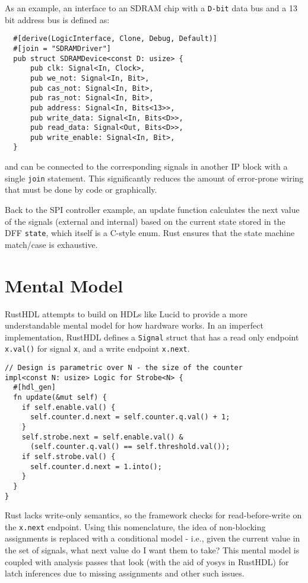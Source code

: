 \documentclass[sigplan,screen,sigconf]{acmart}
\begin{document}
As an example, an interface to an SDRAM chip with a \verb|D-bit| data bus and a 13 bit 
address bus is defined as:

\begin{verbatim}
  #[derive(LogicInterface, Clone, Debug, Default)]
  #[join = "SDRAMDriver"]
  pub struct SDRAMDevice<const D: usize> {
      pub clk: Signal<In, Clock>,
      pub we_not: Signal<In, Bit>,
      pub cas_not: Signal<In, Bit>,
      pub ras_not: Signal<In, Bit>,
      pub address: Signal<In, Bits<13>>,
      pub write_data: Signal<In, Bits<D>>,
      pub read_data: Signal<Out, Bits<D>>,
      pub write_enable: Signal<In, Bit>,
  }
\end{verbatim}

and can be connected to the corresponding signals in another IP block with a single \verb|join|
statement.  This significantly reduces the amount of error-prone wiring that must be done
by code or graphically.

Back to the SPI controller example, an update function calculates the next value of the 
signals (external and internal) based on the current state stored in the DFF \verb|state|,
which itself is a C-style enum.  Rust ensures that the state machine match/case is exhaustive. 

\section{Mental Model}
RustHDL attempts to build on HDLs like Lucid\cite{b11} to provide a more understandable mental model for how 
hardware works.  In an imperfect implementation, RustHDL defines a \verb|Signal| struct that has a 
read only endpoint \verb|x.val()| for signal \verb|x|, and a write endpoint \verb|x.next|.  

\begin{verbatim}
// Design is parametric over N - the size of the counter
impl<const N: usize> Logic for Strobe<N> {
  #[hdl_gen]
  fn update(&mut self) {
    if self.enable.val() {
      self.counter.d.next = self.counter.q.val() + 1;
    }
    self.strobe.next = self.enable.val() & 
      (self.counter.q.val() == self.threshold.val());
    if self.strobe.val() {
      self.counter.d.next = 1.into();
    }
  }
} 
\end{verbatim}

Rust lacks write-only semantics, so the framework checks for read-before-write on the \verb|x.next| 
endpoint.  Using this nomenclature, the idea of non-blocking assignments is replaced with a
 conditional model - i.e., given the current value in the set of signals, what next value do I 
want them to take?  This mental model is coupled with analysis passes that look (with the aid 
of yosys\cite{b12} in RustHDL) for latch inferences due to missing assignments and other such issues.
\end{document}
